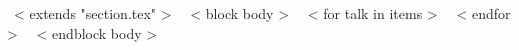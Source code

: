 ~< extends "section.tex" >~
~< block body >~
~< for talk in items >~
~< endfor >~
~< endblock body >~
